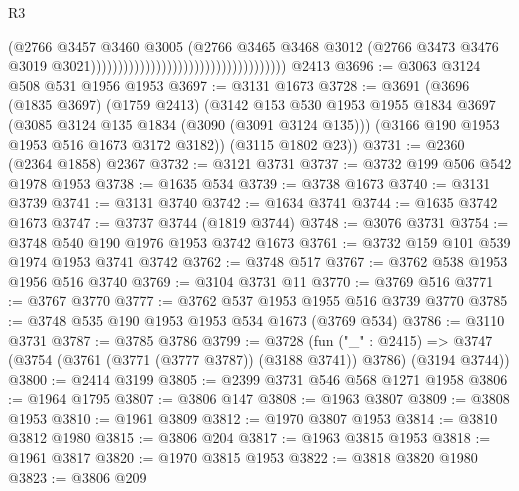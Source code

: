 \begin{lexlean}{R3}
\begin{coremodule}
                                                                      (@2766
                                                                        @3457
                                                                        @3460
                                                                        @3005
                                                                        (@2766
                                                                          @3465
                                                                          @3468
                                                                          @3012
                                                                          (@2766
                                                                            @3473
                                                                            @3476
                                                                            @3019
                                                                            @3021))))))))))))))))))))))))))))))))))))
    @2413
@3696 := @3063 @3124 @508 @531 @1956 @1953
@3697 := @3131 @1673
@3728 := @3691
    (@3696
      (@1835 @3697)
      (@1759 @2413)
      (@3142
        @153
        @530
        @1953
        @1955
        @1834
        @3697
        (@3085 @3124 @135 @1834 (@3090 (@3091 @3124 @135)))
        (@3166 @190 @1953 @1953 @516 @1673 @3172 @3182))
      (@3115 @1802 @23))
@3731 := @2360 (@2364 @1858) @2367
@3732 := @3121 @3731
@3737 := @3732 @199 @506 @542 @1978 @1953
@3738 := @1635 @534
@3739 := @3738 @1673
@3740 := @3131 @3739
@3741 := @3131 @3740
@3742 := @1634 @3741
@3744 := @1635 @3742 @1673
@3747 := @3737 @3744 (@1819 @3744)
@3748 := @3076 @3731
@3754 := @3748 @540 @190 @1976 @1953 @3742 @1673
@3761 := @3732 @159 @101 @539 @1974 @1953 @3741 @3742
@3762 := @3748 @517
@3767 := @3762 @538 @1953 @1956 @516 @3740
@3769 := @3104 @3731 @11
@3770 := @3769 @516
@3771 := @3767 @3770
@3777 := @3762 @537 @1953 @1955 @516 @3739 @3770
@3785 := @3748 @535 @190 @1953 @1953 @534 @1673 (@3769 @534)
@3786 := @3110 @3731
@3787 := @3785 @3786
@3799 := @3728
    (fun ("_" : @2415) =>
    @3747 (@3754 (@3761 (@3771 (@3777 @3787)) (@3188 @3741)) @3786) (@3194 @3744))
@3800 := @2414 @3199
@3805 := @2399 @3731 @546 @568 @1271 @1958
@3806 := @1964 @1795
@3807 := @3806 @147
@3808 := @1963 @3807
@3809 := @3808 @1953
@3810 := @1961 @3809
@3812 := @1970 @3807 @1953
@3814 := @3810 @3812 @1980
@3815 := @3806 @204
@3817 := @1963 @3815 @1953
@3818 := @1961 @3817
@3820 := @1970 @3815 @1953
@3822 := @3818 @3820 @1980
@3823 := @3806 @209

\end{coremodule}
\end{lexlean}
